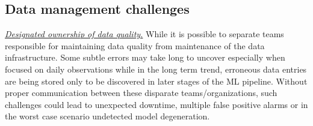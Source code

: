


\subsection{Data management challenges}


\underline{\emph{Designated ownership of data quality.}} While it is possible to separate teams responsible for maintaining data quality from maintenance of the data infrastructure. Some subtle errors may take long to uncover especially when focused on daily observations while in the long term trend, erroneous data entries are being stored only to be discovered in later stages of the ML pipeline. Without proper communication between these disparate teams/organizations, such challenges could lead to unexpected downtime, multiple false positive alarms or in the worst case scenario undetected model degeneration. %


